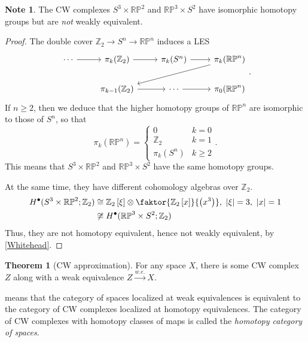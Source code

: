 \documentclass[10pt,letterpaper,cm]{nupset}
\theoremstyle{definition}
\newtheorem{note}[defn]{Note}
\theoremstyle{theorem}
\newtheorem{theorem}[defn]{Theorem}
\theoremstyle{remark}
\newcommand{\RP}{\mathbb{RP}}
\newcommand{\Z}{\mathbb Z}
\newcommand{\1}{\mathbb{1}}
\newcommand{\0}{\vec 0}
\begin{document}
\begin{note}\label{warn}
The CW complexes $S^3 \times \RP^2$ and $\RP^3 \times S^2$ have isomorphic homotopy groups but are \emph{not} weakly equivalent.
\end{note}
\begin{proof}
The  double cover $\Z_2 \to S^n \to \RP^n$ induces a LES
\[\begin{tikzcd}
	\cdots & {\pi_k(\Z_2)} & {\pi_k(S^n)} & {\pi_k(\RP^n)} \\
	& {\pi_{k-1}(\Z_2)} & \cdots & {\pi_0(\RP^n)}
	\arrow[from=1-1, to=1-2]
	\arrow[from=1-2, to=1-3]
	\arrow[from=1-3, to=1-4]
	\arrow[from=1-4, to=2-2]
	\arrow[from=2-2, to=2-3]
	\arrow[from=2-3, to=2-4]
\end{tikzcd}.\]
If $n\geq 2$, then we deduce that the higher homotopy groups of $\RP^n$ are isomorphic to those of $S^n$, so that
\[
\pi_k(\RP^n) = \begin{cases}
0 & k= 0
\\ \Z_2 & k=1 
\\ \pi_k(S^n) & k\geq 2
\end{cases}
.\]
This means that $S^3 \times \RP^2$ and $\RP^3 \times S^2$ have the same homotopy groups. 

\medskip

At the same time, they have different cohomology algebras over $\Z_2$.
\begin{align*}
H^{\bullet}(S^3 \times \RP^2; \Z_2) & \cong \Z_2\left[\xi\right] \otimes \faktor{\Z_2\left[x\right]}{\left(x^3\right)}, \ \left\lvert{\xi}\right\rvert = 3, \ \left\lvert{x}\right\rvert = 1
\\ & \not \cong H^{\bullet}(\RP^3 \times S^2; \Z_2)
\end{align*}
Thus, they are not homotopy equivalent, hence not weakly equivalent, by \cref{Whitehead}.
\end{proof}

\begin{theorem}[CW approximation]\label{CWapprox}
For any space $X$, there is some CW complex $Z$ along with a weak equivalence $Z \xrightarrow{\textit{w.e.}} X$.
\end{theorem}

 means that the category of spaces localized at weak equivalences is equivalent to the category of CW complexes localized at homotopy equivalences. The category of CW complexes with homotopy classes of maps is called the \textit{homotopy category of spaces}.
\end{document}
